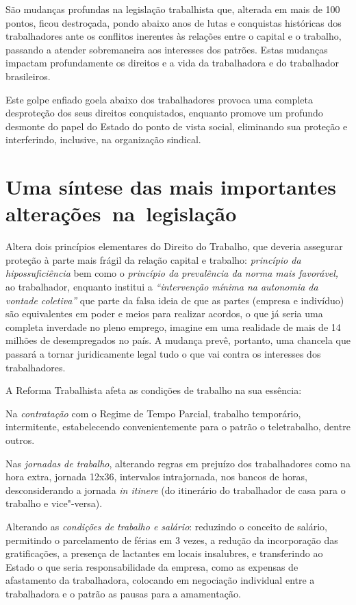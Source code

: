 São mudanças profundas na legislação trabalhista que, alterada em mais
de 100 pontos, ficou destroçada, pondo abaixo anos de lutas e conquistas
históricas dos trabalhadores ante os conflitos inerentes às relações
entre o capital e o trabalho, passando a atender sobremaneira aos
interesses dos patrões. Estas mudanças impactam profundamente os
direitos e a vida da trabalhadora e do trabalhador brasileiros.

Este golpe enfiado goela abaixo dos trabalhadores provoca uma completa
desproteção dos seus direitos conquistados, enquanto promove um profundo
desmonte do papel do Estado do ponto de vista social, eliminando sua
proteção e interferindo, inclusive, na organização sindical.

\section{Uma síntese das mais importantes alterações~na~legislação}

Altera dois princípios elementares do Direito do Trabalho, que deveria
assegurar proteção à parte mais frágil da relação capital e trabalho:
\emph{princípio da hipossuficiência} bem como o \emph{princípio da
prevalência da norma mais favorável,} ao trabalhador, enquanto institui
a \emph{``intervenção mínima na autonomia da vontade coletiva''} que
parte da falsa ideia de que as partes (empresa e indivíduo) são
equivalentes em poder e meios para realizar acordos, o que já seria uma
completa inverdade no pleno emprego, imagine em uma realidade de mais de
14 milhões de desempregados no país. A mudança prevê, portanto, uma
chancela que passará a tornar juridicamente legal tudo o que vai contra
os interesses dos trabalhadores.

A Reforma Trabalhista afeta as condições de trabalho na sua essência:

Na \emph{contratação} com o Regime de Tempo Parcial, trabalho
temporário, intermitente, estabelecendo convenientemente para o patrão o
teletrabalho, dentre outros.

Nas \emph{jornadas de trabalho}, alterando regras em prejuízo dos
trabalhadores como na hora extra, jornada 12x36, intervalos
intrajornada, nos bancos de horas, desconsiderando a jornada \emph{in
itinere} (do itinerário do trabalhador de casa para o trabalho e
vice"-versa).

Alterando as \emph{condições de trabalho e salário}: reduzindo o
conceito de salário, permitindo o parcelamento de férias em 3 vezes, a
redução da incorporação das gratificações, a presença de lactantes em
locais insalubres, e transferindo ao Estado o que seria responsabilidade
da empresa, como as expensas de afastamento da trabalhadora, colocando em
negociação individual entre a trabalhadora e o patrão as pausas para a
amamentação.

